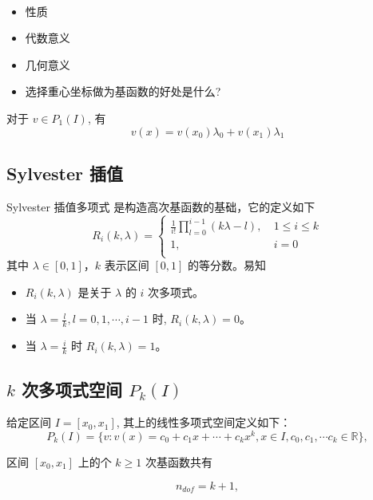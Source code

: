 \documentclass{article}
\begin{document}
\begin{framed}
\begin{remark}
~\\
\begin{itemize}
    \item 性质
    \item 代数意义
    \item 几何意义
    \item 选择重心坐标做为基函数的好处是什么?
\end{itemize}
\end{remark}
\end{framed}

对于 $v \in P_1(I)$, 有
$$
v(x) = v(x_0)\lambda_0 + v(x_1) \lambda_1
$$

\subsection{Sylvester 插值}
Sylvester 插值多项式\cite{sheng2008} 是构造高次基函数的基础，它的定义如下
$$
R_i(k,\lambda)=
\begin{cases}
\frac{1}{i!}\prod_{l=0}^{i-1} (k\lambda-l),~& 1\leq i\leq k\\
1,& i=0\\
\end{cases}
$$
其中 $\lambda \in [0,1]$，$k$ 表示区间 $[0,1]$ 的等分数。易知 

\begin{itemize}
    \item $R_i(k, \lambda)$ 是关于 $\lambda$ 的 $i$ 次多项式。
    \item 当 $\lambda= \frac{l}{k}, l=0, 1, \cdots, i-1$ 时, $R_i(k, \lambda) =0$。
    \item 当 $\lambda=\frac{i}{k}$ 时 $R_i(k, \lambda) = 1$。
\end{itemize}

\subsection{$k$ 次多项式空间 $P_k(I)$}

给定区间 $I = [x_0, x_1]$, 其上的线性多项式空间定义如下：
\begin{equation}
    P_k(I) = \{v: v(x) = c_0 + c_1 x + \cdots + c_k x^k, x\in I, c_0, c_1,
    \cdots c_k \in \mathbb R\},
\end{equation}

区间 $[x_0, x_1]$ 上的个 $ k\geq 1 $ 次基函数共有 

\[
n_{dof} = k+1,
\]
\end{document}
